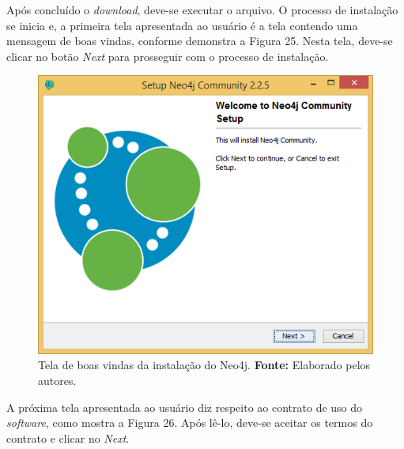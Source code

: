 \par Após concluído o \textit{download}, deve-se executar o arquivo. O processo de instalação se inicia e, a primeira tela apresentada ao usuário é a tela contendo uma mensagem de boas vindas, conforme demonstra a Figura 25. Nesta tela, deve-se clicar no botão \textit{Next} para prosseguir com o processo de instalação.

\begin{figure}[h!]
	\centerline{\includegraphics[scale=0.4]{./imagens/neo4j-install-step1.png}}
	\caption[Tela de boas vindas da instalação do Neo4j]
	{Tela de boas vindas da instalação do Neo4j. \textbf{Fonte:} Elaborado pelos autores.}
	\label{fig:exemplo1}
\end{figure}

\par A próxima tela apresentada ao usuário diz respeito ao contrato de uso do \textit{software}, como mostra a Figura 26. Após lê-lo, deve-se aceitar os termos do contrato e clicar no \textit{Next}.

